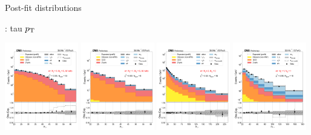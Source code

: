 \begin{frame}{}
Post-fit distributions
    \begin{tcolorbox}[colframe=NUpurple]{ \cet: tau $p_{\mathrm{T}}$}
        \begin{center}
            \includegraphics[width=0.24\textwidth]{chapters/Analysis/sectionStatisticalAnalysis/figures/fit/etau_cat_eq0_eq0}
            \includegraphics[width=0.24\textwidth]{chapters/Analysis/sectionStatisticalAnalysis/figures/fit/etau_cat_eq1_eq0}
            \includegraphics[width=0.24\textwidth]{chapters/Analysis/sectionStatisticalAnalysis/figures/fit/etau_cat_gt2_eq0}
            \includegraphics[width=0.24\textwidth]{chapters/Analysis/sectionStatisticalAnalysis/figures/fit/etau_cat_eq1_eq1}


\end{center}
\end{tcolorbox}
\end{frame}
